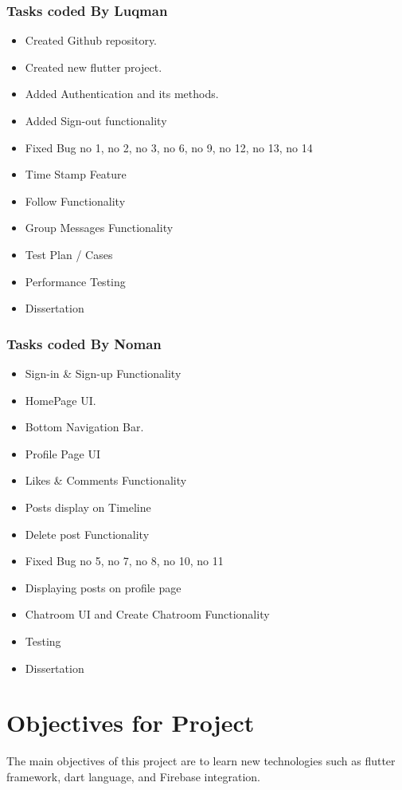\subsubsection{Tasks coded By Luqman}
\begin{itemize}
    \item Created Github repository.
    \item Created new flutter project.
    \item Added Authentication and its methods.
    \item Added Sign-out functionality
    \item Fixed Bug no 1, no 2, no 3, no 6, no 9, no 12, no 13, no 14
    \item Time Stamp Feature
    \item Follow Functionality
    \item Group Messages Functionality
    \item Test Plan / Cases
    \item Performance Testing
    \item Dissertation
    
\end{itemize}

\subsubsection{Tasks coded By Noman}
\begin{itemize}
    \item Sign-in \& Sign-up Functionality
    \item HomePage UI.
    \item Bottom Navigation Bar.
    \item Profile Page UI
    \item Likes \& Comments Functionality
    \item Posts display on Timeline
    \item Delete post Functionality
    \item Fixed Bug no 5, no 7, no 8, no 10, no 11
    \item Displaying posts on profile page
    \item Chatroom UI and Create Chatroom Functionality
    \item Testing
    \item Dissertation
\end{itemize}

\section{Objectives for Project}
The main objectives of this project are to learn new technologies such as flutter framework, dart language, and Firebase integration.

